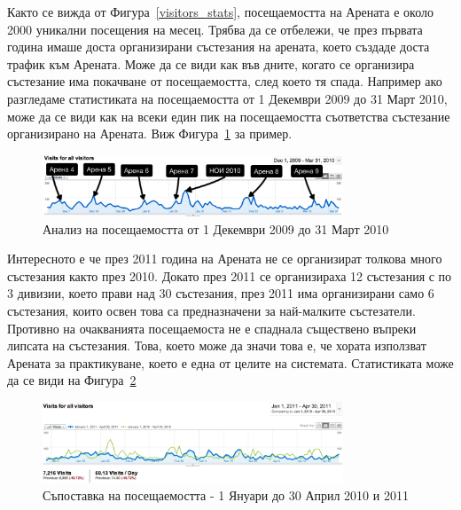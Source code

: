 \documentclass[a4paper,12pt]{article}
\begin{document}
  Както се вижда от Фигура~\ref{visitors_stats}, посещаемостта на Арената е около 2000 уникални посещения на месец. Трябва да се отбележи, че през първата година имаше доста организирани състезания на арената, което създаде доста трафик към Арената. Може да се види как във дните, когато се организира състезание има покачване от посещаемостта, след което тя спада. Например ако разгледаме статистиката на посещаемостта от 1 Декември 2009 до 31 Март 2010, може да се види как на всеки един пик на посещаемостта съответства състезание организирано на Арената. Виж Фигура~\ref{visits_on_contests} за пример.

  \begin{figure}[ht]
    \begin{center}
      \includegraphics[width=0.8\textwidth]{images/visits_on_contests.png}
    \end{center}
    \caption{Анализ на посещаемостта от 1 Декември 2009 до 31 Март 2010}
    \label{visits_on_contests}
  \end{figure}

  Интересното е че през 2011 година на Арената не се организират толкова много състезания както през 2010. Докато през 2011 се организираха 12 състезания с по 3 дивизии, което прави над 30 състезания, през 2011 има организирани само 6 състезания, които освен това са предназначени за най-малките състезатели. Противно на очакванията посещаемоста не е спаднала съществено въпреки липсата на състезания. Това, което може да значи това е, че хората използват Арената за практикуване, което е една от целите на системата. Статистиката може да се види на Фигура~\ref{visits_comparison}

  \begin{figure}[ht]
    \begin{center}
      \includegraphics[width=0.8\textwidth]{images/visits_comparison.png}
    \end{center}
    \caption{Съпоставка на посещаемостта - 1 Януари до 30 Април 2010 и 2011}
    \label{visits_comparison}
  \end{figure}
  
\end{document}
